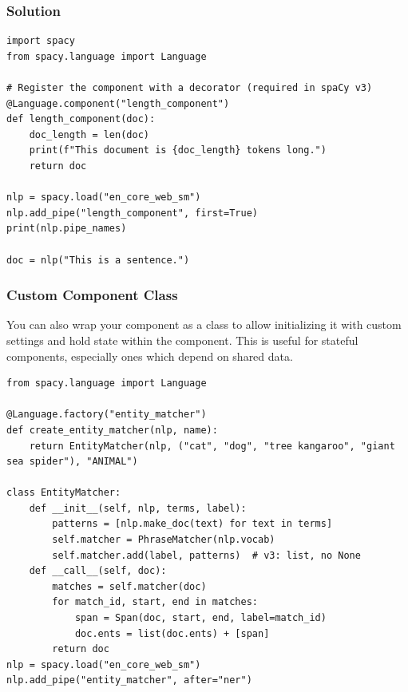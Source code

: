 \begin{frame}[fragile]\frametitle{Solution}

  \begin{lstlisting}
import spacy
from spacy.language import Language

# Register the component with a decorator (required in spaCy v3)
@Language.component("length_component")
def length_component(doc):
    doc_length = len(doc)
    print(f"This document is {doc_length} tokens long.")
    return doc

nlp = spacy.load("en_core_web_sm")
nlp.add_pipe("length_component", first=True)
print(nlp.pipe_names)

doc = nlp("This is a sentence.")
  \end{lstlisting}

\end{frame}

\begin{frame}[fragile]\frametitle{Custom Component Class}
You can also wrap your component as a class to allow initializing it with custom settings and hold state within the component. This is useful for stateful components, especially ones which depend on shared data.
		\begin{lstlisting}
from spacy.language import Language

@Language.factory("entity_matcher")
def create_entity_matcher(nlp, name):
    return EntityMatcher(nlp, ("cat", "dog", "tree kangaroo", "giant sea spider"), "ANIMAL")

class EntityMatcher:
    def __init__(self, nlp, terms, label):
        patterns = [nlp.make_doc(text) for text in terms]
        self.matcher = PhraseMatcher(nlp.vocab)
        self.matcher.add(label, patterns)  # v3: list, no None
    def __call__(self, doc):
        matches = self.matcher(doc)
        for match_id, start, end in matches:
            span = Span(doc, start, end, label=match_id)
            doc.ents = list(doc.ents) + [span]
        return doc
nlp = spacy.load("en_core_web_sm")
nlp.add_pipe("entity_matcher", after="ner")
\end{lstlisting}	
	
\end{frame}

